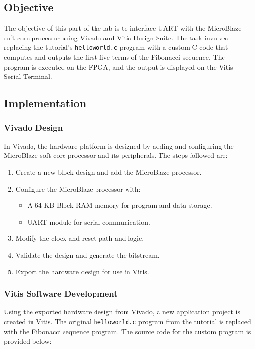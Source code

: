 \subsection{Objective}
The objective of this part of the lab is to interface UART with the MicroBlaze soft-core processor using Vivado and Vitis Design Suite. The task involves replacing the tutorial's \texttt{helloworld.c} program with a custom C code that computes and outputs the first five terms of the Fibonacci sequence. The program is executed on the FPGA, and the output is displayed on the Vitis Serial Terminal.

\subsection{Implementation}

\subsubsection{Vivado Design}
In Vivado, the hardware platform is designed by adding and configuring the MicroBlaze soft-core processor and its peripherals. The steps followed are:
\begin{enumerate}
    \item Create a new block design and add the MicroBlaze processor.
    \item Configure the MicroBlaze processor with:
    \begin{itemize}
        \item A 64 KB Block RAM memory for program and data storage.
        \item UART module for serial communication.
    \end{itemize}
    \item Modify the clock and reset path and logic.
    \item Validate the design and generate the bitstream.
    \item Export the hardware design for use in Vitis.
\end{enumerate}

\subsubsection{Vitis Software Development}
Using the exported hardware design from Vivado, a new application project is created in Vitis. The original \texttt{helloworld.c} program from the tutorial is replaced with the Fibonacci sequence program. The source code for the custom program is provided below:

